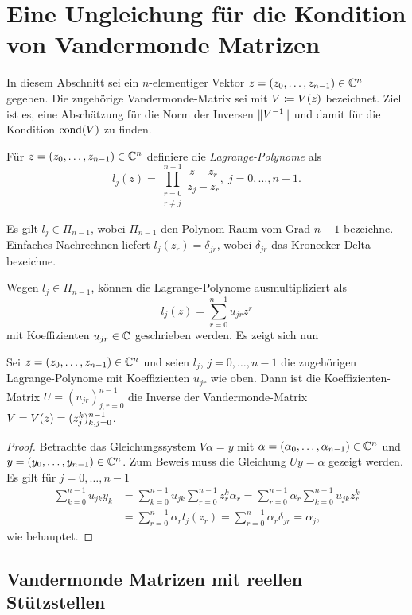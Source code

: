 \chapter{Eine Ungleichung für die Kondition von Vandermonde Matrizen}
In diesem Abschnitt sei ein $n$-elementiger Vektor $z = (z_0, \dots, z_{n-1}) \in \mathbb{C}^n$ gegeben.
Die zugehörige Vandermonde-Matrix sei mit $V \coloneqq \text{$V(z)$}$ bezeichnet.
Ziel ist es, eine Abschätzung für die Norm der Inversen $\lVert V^{-1}\rVert$
und damit für die Kondition $\text{cond$(V)$}$
zu finden.

\begin{mydef}
    Für $ z = (z_0, \dots, z_{n-1}) \in \mathbb{C}^n $ definiere die
    \emph{Lagrange-Polynome} als
    \[
        l_j(z) = \prod_{\substack{r=0\\ r \neq j}}^{n-1} \frac{z - z_r}{z_j - z_r}, \; j = 0, \dots, n-1.
    \]
\end{mydef}

\begin{remark}
    Es gilt $l_j \in \Pi_{n-1}$, wobei $\Pi_{n-1}$ den Polynom-Raum vom Grad $n-1$ bezeichne.
    Einfaches Nachrechnen liefert $l_j(z_r) = \delta_{jr}$,
    wobei $\delta_{jr}$ das Kronecker-Delta bezeichne.
\end{remark}

Wegen $l_j \in \Pi_{n-1}$, können die Lagrange-Polynome ausmultipliziert als
\[
    l_j(z) = \sum_{r = 0}^{n-1} u_{jr} z^{r}
\]
mit Koeffizienten $u_{jr} \in \mathbb{C}$ geschrieben werden.
Es zeigt sich nun
\begin{lemma}
    Sei $z = (z_0, \dots, z_{n-1}) \in \mathbb{C}^n$ und seien
    $l_j$, $j = 0, \dots, n-1$ die zugehörigen Lagrange-Polynome
    mit Koeffizienten $u_{jr}$ wie oben.
    Dann ist die Koeffizienten-Matrix $U = (u_{jr})_{j,r = 0}^{n-1}$ die
    Inverse der Vandermonde-Matrix $V = \text{$V(z)$} = (z_{j}^{k})_{k,j = 0}^{n-1}$.
\end{lemma}

\begin{proof}
    Betrachte das Gleichungssystem $V \alpha = y$ mit $\alpha = (\alpha_0,
    \dots, \alpha_{n-1}) \in \mathbb{C}^n$ und $y = (y_0, \dots, y_{n-1}) \in \mathbb{C}^n$.
    Zum Beweis muss die Gleichung $U y = \alpha$ gezeigt werden.
    Es gilt für $j = 0, \dots, n-1$
    \[
        \begin{split}
            \sum_{k=0}^{n-1} u_{jk} y_k &= \sum_{k=0}^{n-1} u_{jk} \sum_{r=0}^{n-1} z_r^k \alpha_r = \sum_{r=0}^{n-1} \alpha_r \sum_{k=0}^{n-1} u_{jk} z_r^k\\
                                        &= \sum_{r=0}^{n-1} \alpha_r l_j(z_r) = \sum_{r=0}^{n-1} \alpha_r \delta_{jr} = \alpha_j,
        \end{split}
    \]
    wie behauptet.
\end{proof}

\section{Vandermonde Matrizen mit reellen Stützstellen}

